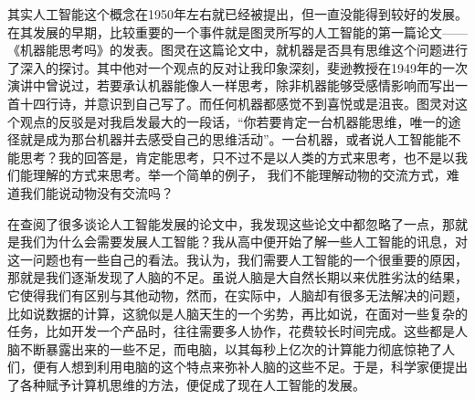 \documentclass[UTF8]{XJTUthesis}
\begin{document}
其实人工智能这个概念在1950年左右就已经被提出，但一直没能得到较好的发展。在其发展的早期，比较重要的一个事件就是图灵所写的人工智能的第一篇论文——《机器能思考吗》的发表。图灵在这篇论文中，就机器是否具有思维这个问题进行了深入的探讨。其中他对一个观点的反对让我印象深刻，斐逊教授在1949年的一次演讲中曾说过，若要承认机器能像人一样思考，除非机器能够受感情影响而写出一首十四行诗，并意识到自己写了。而任何机器都感觉不到喜悦或是沮丧。图灵对这个观点的反驳是对我启发最大的一段话，“你若要肯定一台机器能思维，唯一的途径就是成为那台机器并去感受自己的思维活动”。一台机器，或者说人工智能能不能思考？我的回答是，肯定能思考，只不过不是以人类的方式来思考，也不是以我们能理解的方式来思考。举一个简单的例子， 我们不能理解动物的交流方式，难道我们能说动物没有交流吗？\par
在查阅了很多谈论人工智能发展的论文中，我发现这些论文中都忽略了一点，那就是我们为什么会需要发展人工智能？我从高中便开始了解一些人工智能的讯息，对这一问题也有一些自己的看法。我认为，我们需要人工智能的一个很重要的原因，那就是我们逐渐发现了人脑的不足。虽说人脑是大自然长期以来优胜劣汰的结果，它使得我们有区别与其他动物，然而，在实际中，人脑却有很多无法解决的问题，比如说数据的计算，这貌似是人脑天生的一个劣势，再比如说，在面对一些复杂的任务，比如开发一个产品时，往往需要多人协作，花费较长时间完成。这些都是人脑不断暴露出来的一些不足，而电脑，以其每秒上亿次的计算能力彻底惊艳了人们，便有人想到利用电脑的这个特点来弥补人脑的这些不足。于是，科学家便提出了各种赋予计算机思维的方法，便促成了现在人工智能的发展。\par
\end{document}

